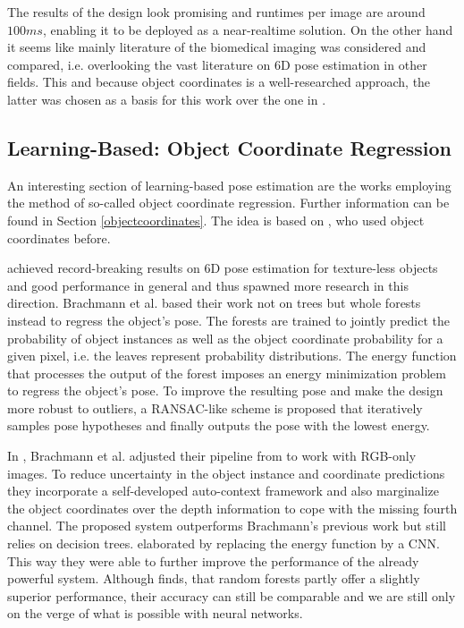 The results of the design look promising and runtimes per image are around $100 ms$, enabling it to be deployed as a near-realtime solution. On the other hand it seems like mainly literature of the biomedical imaging was considered and compared, i.e. overlooking the vast literature on 6D pose estimation in other fields. This and because object coordinates is a well-researched approach, the latter was chosen as a basis for this work over the one in \cite{kurmann}. 

\subsection{Learning-Based: Object Coordinate Regression}

An interesting section of learning-based pose estimation are the works employing the method of so-called object coordinate regression. Further information can be found in Section \ref{objectcoordinates}. The idea is based on \cite{tsharp}, who used object coordinates before. 

\cite{brachmann1} achieved record-breaking results on 6D pose estimation for texture-less objects and good performance in general and thus spawned more research in this direction. Brachmann et al. based their work not on trees but whole forests instead to regress the object's pose. The forests are trained to jointly predict the probability of object instances as well as the object coordinate probability for a given pixel, i.e. the leaves represent probability distributions. The energy function that processes the output of the forest imposes an energy minimization problem to regress the object's pose. To improve the resulting pose and make the design more robust to outliers, a RANSAC-like scheme is proposed that iteratively samples pose hypotheses and finally outputs the pose with the lowest energy.

In \cite{brachmann2}, Brachmann et al. adjusted their pipeline from \cite{brachmann1} to work with RGB-only images. To reduce uncertainty in the object instance and coordinate predictions they incorporate a self-developed auto-context framework and also marginalize the object coordinates over the depth information to cope with the missing fourth channel. The proposed system outperforms Brachmann's previous work but still relies on decision trees. \cite{akrull} elaborated \cite{brachmann1} by replacing the energy function by a CNN. This way they were able to further improve the performance of the already powerful system. Although \cite{trees-vs-cnn} finds, that random forests partly offer a slightly superior performance, their accuracy can still be comparable and we are still only on the verge of what is possible with neural networks.

